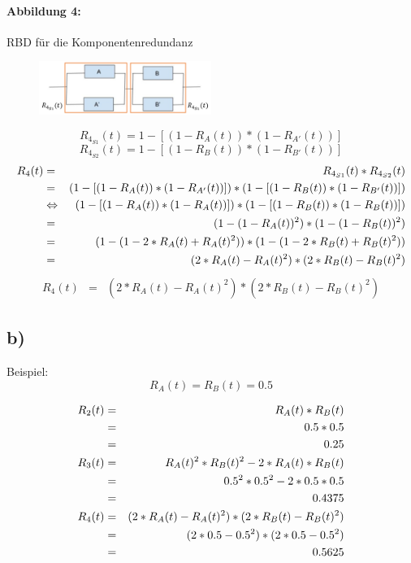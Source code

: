 	\newpage
	\paragraph{Abbildung 4:}
		RBD für die Komponentenredundanz
		\begin{figure}[h]
			\centering
			\includegraphics[width=0.5\textwidth]{../2/abbildung_4.png}
		\end{figure}
		\begin{equation}
			R_{4_{S1}}(t) = 1 - [ (1 - R_A(t)) * (1 - R_{A'}(t)) ]
		\end{equation}
		\begin{equation}
			R_{4_{S2}}(t) = 1 - [ (1 - R_B(t)) * (1 - R_{B'}(t)) ]
		\end{equation}
		\begin{eqnarray}
			R_4(t) &=&				R_{4_{S1}}(t) * R_{4_{S2}}(t)
			\cr &=&					(1 - [ (1 - R_A(t)) * (1 - R_{A'}(t)) ]) * (1 - [ (1 - R_B(t)) * (1 - R_{B'}(t)) ])
			\cr &\Leftrightarrow&	(1 - [ (1 - R_A(t)) * (1 - R_A(t)) ]) * (1 - [ (1 - R_B(t)) * (1 - R_B(t)) ])
			\cr &=&					(1 - (1 - R_A(t))^2) * (1 - (1 - R_B(t))^2)
			\cr &=&					(1 - (1 - 2*R_A(t) + R_A(t)^2)) * (1 - (1 - 2*R_B(t) + R_B(t)^2))
			\cr &=&					(2*R_A(t) - R_A(t)^2) * (2*R_B(t) - R_B(t)^2)
		\end{eqnarray}
		\begin{eqnarray}
			R_4(t) &=& (2*R_A(t) - R_A(t)^2) * (2*R_B(t) - R_B(t)^2)
		\end{eqnarray}


\subsection*{b)}

	Beispiel:
	\begin{equation}
		R_A(t) = R_B(t) = 0.5
	\end{equation}

	\begin{eqnarray}
		R_2(t)		&=& R_A(t) * R_B(t)
		\cr			&=& 0.5 * 0.5
		\cr			&=& 0.25
		\cr R_3(t)	&=& R_A(t)^2 * R_B(t)^2 - 2*R_A(t)*R_B(t)
		\cr			&=& 0.5^2 * 0.5^2 - 2*0.5*0.5
		\cr			&=& 0.4375
		\cr R_4(t)	&=& (2*R_A(t) - R_A(t)^2) * (2*R_B(t) - R_B(t)^2)
		\cr			&=& (2*0.5 - 0.5^2) * (2*0.5 - 0.5^2)
		\cr			&=& 0.5625
	\end{eqnarray}
	